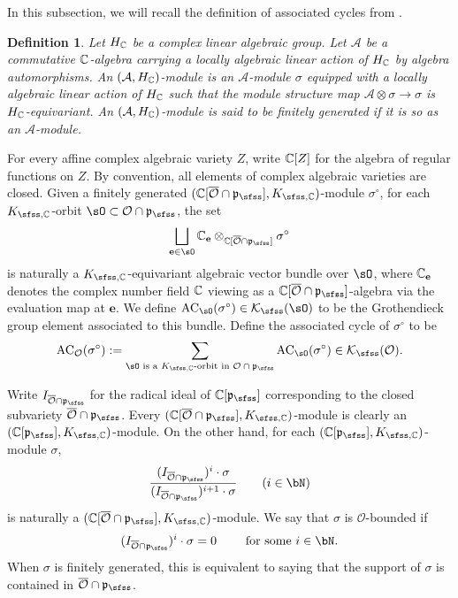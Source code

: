 \documentclass[12pt,a4paper]{amsart}
\newcommand{\CA}{{\mathcal {A}}}
\newcommand{\CK}{{\mathcal {K}}}
\newcommand{\CO}{{\mathcal {O}}}
\newcommand{\oS}{\operatorname{S}}
\newcommand{\p}{\mathfrak p}
\numberwithin{equation}{section}
\newtheorem{defn}[thm]{Definition}
\theoremstyle{remark}
\begin{document}
In this subsection, we will recall the definition of associated cycles from \cite{Vo89}.
\begin{defn}\label{spkmodule}
 Let $H_{\mathbb{C}}$ be a complex linear algebraic group. Let $\CA$ be a commutative $\mathbb{C}$-algebra carrying a locally algebraic linear action of $H_{\mathbb{C}}$ by algebra automorphisms.
  An $(\CA, H_\C)$-module is an  $\CA$-module
$
  \sigma
$
equipped with a locally algebraic linear action of $H_{\mathbb{C}}$ such that
the module structure map
$
  \CA\otimes \sigma\rightarrow \sigma
$
is $H_{\mathbb{C}}$-equivariant. An $(\CA, H_\C)$-module is said to be finitely generated if it is so as an $\CA$-module.

\end{defn}



For every affine complex algebraic variety $Z$, write $\mathbb{C}[Z]$ for the algebra of regular functions on $Z$. By convention, all elements of complex algebraic varieties are closed. 
Given a finitely generated $(\C[\overline \CO\cap \p_\sfss], K_{\sfss, \C})$-module $\sigma^\circ$, for each $K_{\sfss, \C}$-orbit $\sO\subset \CO\cap \p_\sfss$, the set
\[
  \bigsqcup_{\mathbf e\in \sO} \C_\mathbf e\otimes_{\C[\overline \CO\cap \p_\sfss]}\sigma^\circ
\]
is naturally a $K_{\sfss, \C}$-equivariant algebraic vector bundle over $\sO$, where $\mathbb{C}_\mathbf e$  denotes the complex number field $\mathbb{C}$ viewing as a $\C[\overline \CO\cap \p_\sfss]$-algebra via the evaluation map at $\mathbf e$. We define $\mathrm{AC}_\sO(\sigma^\circ)\in \CK_\sfss(\sO)$ to be the Grothendieck group element associated to this bundle. Define the  associated cycle of $\sigma^\circ$ to be
\[
  \mathrm{AC}_\CO(\sigma^\circ):=\sum_{\sO\textrm{ is a   $K_{\sfss, \C}$-orbit in $ \CO\cap \p_\sfss$}} \mathrm{AC}_\sO(\sigma^\circ)\in \CK_\sfss(\CO).
\]


Write $I_{\overline \CO\cap \p_\sfss}$ for the radical ideal of $\C[\p_\sfss]$ corresponding to the closed subvariety $\overline \CO\cap \p_\sfss$.
Every $(\C[\overline \CO\cap \p_\sfss], K_{\sfss, \C})$-module is clearly an $(\C[\p_\sfss], K_{\sfss,\C})$-module.
On the other hand, for each  $(\C[\p_{\sfss}], K_{\sfss, \C})$-module $\sigma$,
\[
  \frac{(I_{\overline \CO\cap \p_\sfss})^i\cdot \sigma}{(I_{\overline \CO\cap \p_\sfss})^{i+1}\cdot \sigma}\qquad (i\in \bN)
\]
is naturally a $(\C[\overline \CO\cap \p_\sfss], K_{\sfss, \C})$-module.
We say that $\sigma$ is $\CO$-bounded if
\[
(I_{\overline \CO\cap \p_\sfss})^i \cdot\sigma=0\qquad
\textrm{
for some $i\in \bN$.}
\]
When $\sigma$ is finitely generated, this is equivalent to saying that  the support of $\sigma$ is contained in $\overline{\CO}\cap \p_\sfss$.
\end{document}

